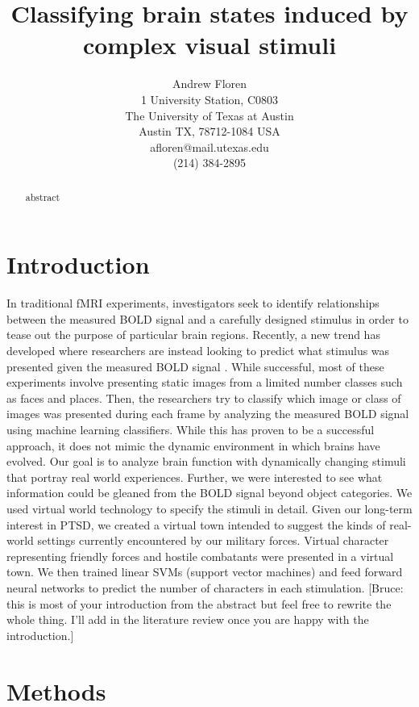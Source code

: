 \documentclass[final]{article}
\title{Classifying brain states induced by complex visual stimuli}
\author{Andrew Floren\\
1 University Station, C0803\\
The University of Texas at Austin\\
Austin TX, 78712-1084 USA\\
afloren@mail.utexas.edu\\
(214) 384-2895\\}
\date{}
\begin{document}
\maketitle

\begin{abstract}
abstract
\end{abstract}

\section{Introduction}
In traditional fMRI experiments, investigators seek to identify relationships between the measured BOLD signal and a carefully designed stimulus in order to tease out the purpose of particular brain regions.
Recently, a new trend has developed where researchers are instead looking to predict what stimulus was presented given the measured BOLD signal \cite{Haxby2001,Mitchell2003,Haynes2006}.
While successful, most of these experiments involve presenting static images from a limited number classes such as faces and places.
Then, the researchers try to classify which image or class of images was presented during each frame by analyzing the measured BOLD signal using machine learning classifiers.
While this has proven to be a successful approach, it does not mimic the dynamic environment in which brains have evolved.
Our goal is to analyze brain function with dynamically changing stimuli that portray real world experiences.
Further, we were interested to see what information could be gleaned from the BOLD signal beyond object categories.
We used virtual world technology to specify the stimuli in detail.
Given our long-term interest in PTSD, we created a virtual town intended to suggest the kinds of real-world settings currently encountered by our military forces.
Virtual character representing friendly forces and hostile combatants were presented in a virtual town.
We then trained linear SVMs (support vector machines) and feed forward neural networks to predict the number of characters in each stimulation.
[Bruce: this is most of your introduction from the abstract but feel free to rewrite the whole thing. I'll add in the literature review once you are happy with the introduction.]

\section{Methods}
\end{document}
